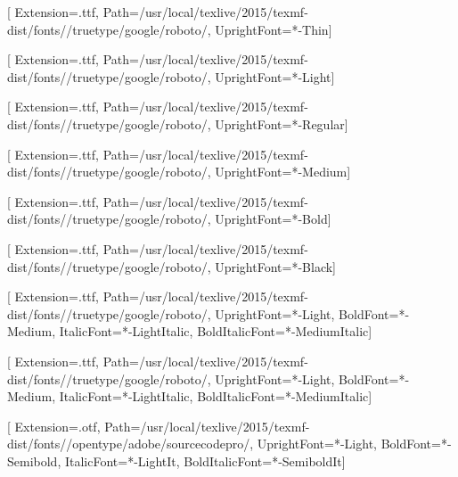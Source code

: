 
\newcommand{\fontdir}[0]{/usr/local/texlive/2015/texmf-dist/fonts/}
\newcommand{\robotodir}[0]{\fontdir/truetype/google/roboto/}
\newcommand{\sourcecodeprodir}[0]{\fontdir/opentype/adobe/sourcecodepro/}

\newfontfamily{}[
  Extension=.ttf,
  Path=\robotodir,
  UprightFont=*-Thin]

\newfontfamily{}[
  Extension=.ttf,
  Path=\robotodir,
  UprightFont=*-Light]

\newfontfamily{}[
  Extension=.ttf,
  Path=\robotodir,
  UprightFont=*-Regular]

\newfontfamily{}[
  Extension=.ttf,
  Path=\robotodir,
  UprightFont=*-Medium]

\newfontfamily{}[
  Extension=.ttf,
  Path=\robotodir,
  UprightFont=*-Bold]

\newfontfamily{}[
  Extension=.ttf,
  Path=\robotodir,
  UprightFont=*-Black]

\setmainfont{Roboto}[
  Extension=.ttf,
  Path=\robotodir,
  UprightFont=*-Light,
  BoldFont=*-Medium,
  ItalicFont=*-LightItalic,
  BoldItalicFont=*-MediumItalic]

\setsansfont{Roboto}[
  Extension=.ttf,
  Path=\robotodir,
  UprightFont=*-Light,
  BoldFont=*-Medium,
  ItalicFont=*-LightItalic,
  BoldItalicFont=*-MediumItalic]

\setmonofont{SourceCodePro}[
  Extension=.otf,
  Path=\sourcecodeprodir,
  UprightFont=*-Light,
  BoldFont=*-Semibold,
  ItalicFont=*-LightIt,
  BoldItalicFont=*-SemiboldIt]
